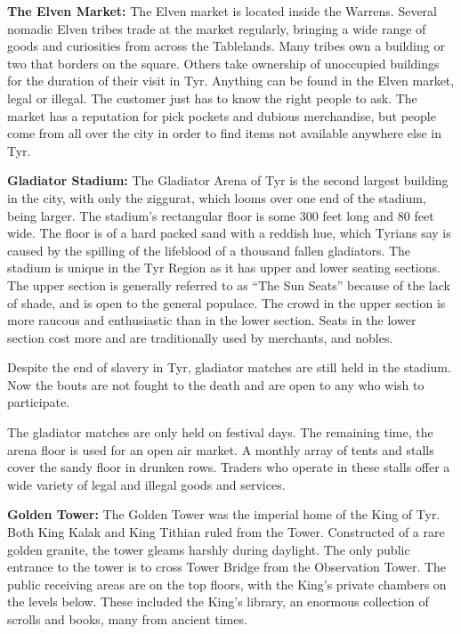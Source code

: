 {
	\textbf{The Elven Market:} The Elven market is located inside the Warrens. Several nomadic Elven tribes trade at the market regularly, bringing a wide range of goods and curiosities from across the Tablelands. Many tribes own a building or two that borders on the square. Others take ownership of unoccupied buildings for the duration of their visit in Tyr. Anything can be found in the Elven market, legal or illegal. The customer just has to know the right people to ask. The market has a reputation for pick pockets and dubious merchandise, but people come from all over the city in order to find items not available anywhere else in Tyr.

	\textbf{Gladiator Stadium:} The Gladiator Arena of Tyr is the second largest building in the city, with only the ziggurat, which looms over one end of the stadium, being larger. The stadium's rectangular floor is some 300 feet long and 80 feet wide. The floor is of a hard packed sand with a reddish hue, which Tyrians say is caused by the spilling of the lifeblood of a thousand fallen gladiators. The stadium is unique in the Tyr Region as it has upper and lower seating sections. The upper section is generally referred to as “The Sun Seats” because of the lack of shade, and is open to the general populace. The crowd in the upper section is more raucous and enthusiastic than in the lower section. Seats in the lower section cost more and are traditionally used by merchants, and nobles.

	Despite the end of slavery in Tyr, gladiator matches are still held in the stadium. Now the bouts are not fought to the death and are open to any who wish to participate.

	The gladiator matches are only held on festival days. The remaining time, the arena floor is used for an open air market. A monthly array of tents and stalls cover the sandy floor in drunken rows. Traders who operate in these stalls offer a wide variety of legal and illegal goods and services.

	\textbf{Golden Tower:} The Golden Tower was the imperial home of the King of Tyr. Both King Kalak and King Tithian ruled from the Tower. Constructed of a rare golden granite, the tower gleams harshly during daylight. The only public entrance to the tower is to cross Tower Bridge from the Observation Tower. The public receiving areas are on the top floors, with the King's private chambers on the levels below. These included the King's library, an enormous collection of scrolls and books, many from ancient times.

}
